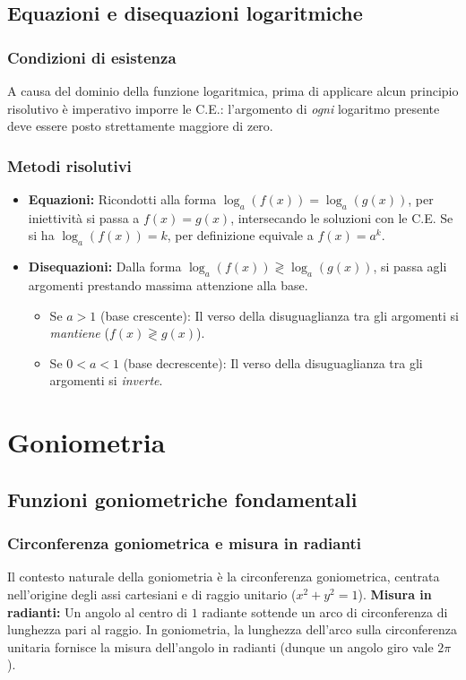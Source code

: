 \subsection{Equazioni e disequazioni logaritmiche}
\subsubsection{Condizioni di esistenza}
A causa del dominio della funzione logaritmica, prima di applicare alcun principio risolutivo è imperativo imporre le C.E.: l'argomento di \textit{ogni} logaritmo presente deve essere posto strettamente maggiore di zero.

\subsubsection{Metodi risolutivi}
\begin{itemize}
    \item \textbf{Equazioni:} Ricondotti alla forma $\log_a(f(x)) = \log_a(g(x))$, per iniettività si passa a $f(x) = g(x)$, intersecando le soluzioni con le C.E. Se si ha $\log_a(f(x)) = k$, per definizione equivale a $f(x) = a^k$.
    \item \textbf{Disequazioni:} Dalla forma $\log_a(f(x)) \gtrless \log_a(g(x))$, si passa agli argomenti prestando massima attenzione alla base.
        \begin{itemize}
            \item Se $a > 1$ (base crescente): Il verso della disuguaglianza tra gli argomenti si \textit{mantiene} ($f(x) \gtrless g(x)$).
            \item Se $0 < a < 1$ (base decrescente): Il verso della disuguaglianza tra gli argomenti si \textit{inverte}.
        \end{itemize}
\end{itemize}

\section{Goniometria}
\subsection{Funzioni goniometriche fondamentali}
\subsubsection{Circonferenza goniometrica e misura in radianti}
Il contesto naturale della goniometria è la circonferenza goniometrica, centrata nell'origine degli assi cartesiani e di raggio unitario ($x^2+y^2=1$).
\textbf{Misura in radianti:} Un angolo al centro di $1$ radiante sottende un arco di circonferenza di lunghezza pari al raggio. In goniometria, la lunghezza dell'arco sulla circonferenza unitaria fornisce la misura dell'angolo in radianti (dunque un angolo giro vale $2\pi$).


